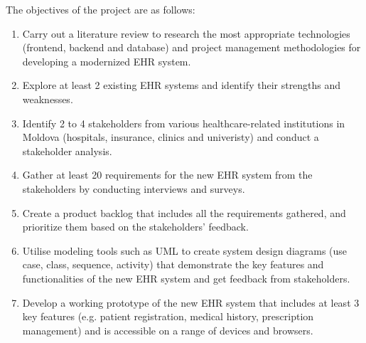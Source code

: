 The objectives of the project are as follows:
\begin{enumerate}
    \item Carry out a literature review to research the most appropriate technologies (frontend, backend and database) and project management methodologies for developing a modernized EHR system.
    \item Explore at least 2 existing EHR systems and identify their strengths and weaknesses.
    \item Identify 2 to 4 stakeholders from various healthcare-related institutions in Moldova (hospitals, insurance, clinics and univeristy) and conduct a stakeholder analysis.
    \item Gather at least 20 requirements for the new EHR system from the stakeholders by conducting interviews and surveys.
    \item Create a product backlog that includes all the requirements gathered, and prioritize them based on the stakeholders' feedback.
    \item Utilise modeling tools such as UML to create system design diagrams (use case, class, sequence, activity) that demonstrate the key features and functionalities of the new EHR system and get feedback from stakeholders.
    \item Develop a working prototype of the new EHR system that includes at least 3 key features (e.g. patient registration, medical history, prescription management) and is accessible on a range of devices and browsers.
\end{enumerate}